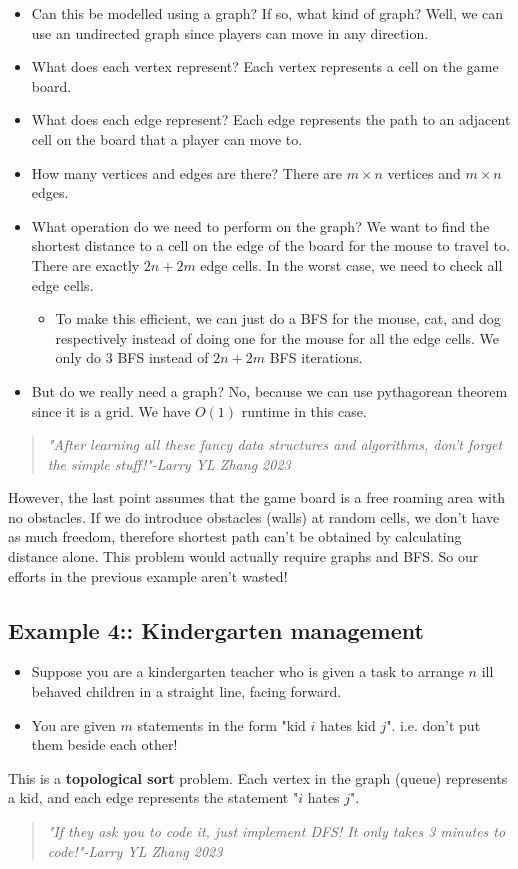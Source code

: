 \documentclass[12pt]{book}
\begin{document}
\begin{itemize}
    \item Can this be modelled using a graph? If so, what kind of graph? Well, we can use an undirected graph since players can move in any direction.
    \item What does each vertex represent? Each vertex represents a cell on the game board.
    \item What does each edge represent? Each edge represents the path to an adjacent cell on the board that a player can move to.
    \item How many vertices and edges are there? There are $m\times n$ vertices and $m\times n$ edges.
    \item What operation do we need to perform on the graph? We want to find the shortest distance to a cell on the edge of the board for the mouse to travel to. There are exactly $2n+2m$ edge cells. In the worst case, we need to check all edge cells.
    \begin{itemize}
        \item To make this efficient, we can just do a BFS for the mouse, cat, and dog respectively instead of doing one for the mouse for all the edge cells. We only do 3 BFS instead of $2n+2m$ BFS iterations. 
    \end{itemize}
    \item But do we really need a graph? No, because we can use pythagorean theorem since it is a grid. We have $O(1)$ runtime in this case. 
\end{itemize}

\begin{quote}
    \textit{"After learning all these fancy data structures and algorithms, don't forget the simple stuff!"-Larry YL Zhang 2023}
\end{quote}

However, the last point assumes that the game board is a free roaming area with no obstacles. If we do introduce obstacles (walls) at random cells, we don't have as much freedom, therefore shortest path can't be obtained by calculating distance alone. This problem would actually require graphs and BFS. So our efforts in the previous example aren't wasted!

\subsection*{Example 4:: Kindergarten management}

\begin{itemize}
    \item Suppose you are a kindergarten teacher who is given a task to arrange $n$ ill behaved children in a straight line, facing forward.
    \item You are given $m$ statements in the form "kid $i$ hates kid $j$". i.e. don't put them beside each other!
\end{itemize}

This is a \textbf{topological sort} problem. Each vertex in the graph (queue) represents a kid, and each edge represents the statement "$i$ hates $j$".

\begin{quote}
    \textit{"If they ask you to code it, just implement DFS! It only takes 3 minutes to code!"-Larry YL Zhang 2023}
\end{quote}
\end{document}
